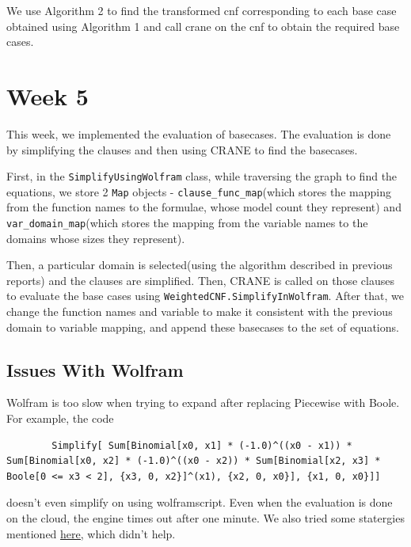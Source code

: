 \documentclass[12pt]{report}
\begin{document}
    We use Algorithm 2 to find the transformed cnf corresponding to each base case obtained using Algorithm 1 and call crane on the cnf to obtain the required base cases.

    \chapter*{Week 5}
    

    This week, we implemented the evaluation of basecases. The evaluation is done by simplifying the clauses and then using CRANE to find the basecases.
    \vspace*{0in}

    First, in the \texttt{SimplifyUsingWolfram} class, while traversing the graph to find the equations, we store 2 \texttt{Map} objects - \texttt{clause\_func\_map}(which stores the mapping from the function names to the formulae, whose model count they represent) and \texttt{var\_domain\_map}(which stores the mapping from the variable names to the domains whose sizes they represent).
    \vspace*{10px}

    Then, a particular domain is selected(using the algorithm described in previous reports) and the clauses are simplified. Then, CRANE is called on those clauses to evaluate the base cases using \texttt{WeightedCNF.SimplifyInWolfram}. After that, we change the function names and variable to make it consistent with the previous domain to variable mapping, and append these basecases to the set of equations.

    \section*{Issues With Wolfram}
    Wolfram is too slow when trying to expand after replacing Piecewise with Boole. For example, the code 
    \begin{lstlisting}
        Simplify[ Sum[Binomial[x0, x1] * (-1.0)^((x0 - x1)) * Sum[Binomial[x0, x2] * (-1.0)^((x0 - x2)) * Sum[Binomial[x2, x3] * Boole[0 <= x3 < 2], {x3, 0, x2}]^(x1), {x2, 0, x0}], {x1, 0, x0}]]
    \end{lstlisting}
    doesn't even simplify on using wolframscript.
    Even when the evaluation is done on the cloud, the engine times out after one minute. 
    We also tried some statergies mentioned \underline{\href{https://community.wolfram.com/groups/-/m/t/989124}{here}}, which didn't help. 
\end{document}
